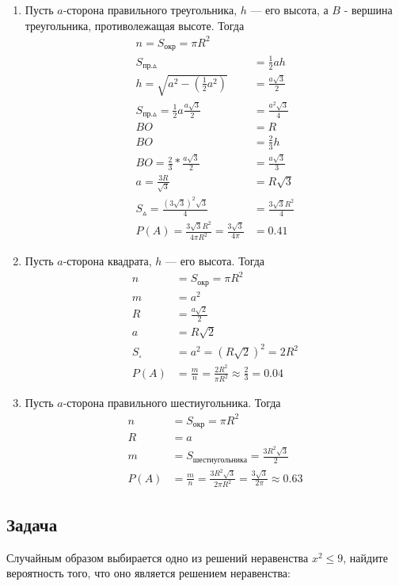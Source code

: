 \documentclass[a4paper,12pt]{extreport}
\begin{document}
\begin{enumerate}
	\item { Пусть $a$-сторона правильного треугольника, $h$ --- его высота, а $B$ - вершина треугольника, противолежащая высоте. Тогда
		\begin{align*}
			n=S_{\text{окр}}=\pi{}R^2\\
			S_{\text{пр.}\vartriangle}&=\frac{1}{2}ah\\
			h=\sqrt{a^2-(\frac{1}{2}a^2)}&=\frac{a\sqrt{3}}{2}\\
			S_{\text{пр.}\vartriangle}=\frac{1}{2}a\frac{a\sqrt{3}}{2}&=\frac{a^2\sqrt{3}}{4}\\
			BO&=R\\
			BO&=\frac{2}{3}h\\
			BO=\frac{2}{3}*\frac{a\sqrt{3}}{2}&=\frac{a\sqrt{3}}{3}\\
			a=\frac{3R}{\sqrt{3}}&=R\sqrt{3}\\
			S_{\vartriangle}=\frac{(3\sqrt{3})^2\sqrt{3}}{4}&=\frac{3\sqrt{3}R^2}{4}\\
			P(A)=\frac{3\sqrt{3}R^2}{4\pi{}R^2}=\frac{3\sqrt{3}}{4\pi}&=0.41
		\end{align*}
	}
	\item { Пусть $a$-сторона квадрата, $h$ --- его высота. Тогда
		\begin{align*}
			n&=S_{\text{окр}}=\pi{}R^2\\
			m&=a^2\\
			R&=\frac{a\sqrt{2}}{2}\\
			a&=R\sqrt{2}\\
			S_\square&=a^2=(R\sqrt{2})^2=2R^2\\
			P(A)&=\frac{m}{n}=\frac{2R^2}{\pi{}R^2}\approx\frac{2}{3}=0.04
		\end{align*}
	}	
	\item { Пусть $a$-сторона правильного шестиугольника. Тогда
		\begin{align*}			
			n&=S_{\text{окр}}=\pi{}R^2\\
			R&=a\\
			m&=S_{\text{шестиугольника}}=\frac{3R^2\sqrt{3}}{2}\\
			P(A)&=\frac{m}{n}=\frac{3R^2\sqrt{3}}{2\pi{}R^2}=\frac{3\sqrt{3}}{2\pi}\approx0.63
		\end{align*}
	}		
\end{enumerate}

\subsection{Задача}
Случайным образом выбирается одно из решений неравенства $x^2\leq9$, найдите вероятность того, что оно является решением неравенства:
\end{document}
